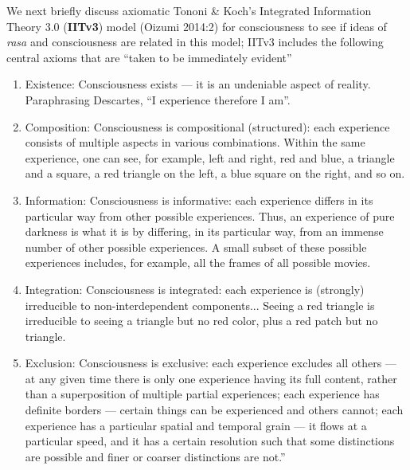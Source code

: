 We next briefly discuss axiomatic Tononi \& Koch’s Integrated Information Theory 3.0 (\textbf{IITv3}) model (Oizumi 2014:2) for consciousness to see if ideas of \textsl{rasa} and consciousness are related in this model; IITv3 includes the following central axioms that are “taken to be immediately evident”
\begin{enumerate}
\renewcommand{\labelenumi}{\theenumi:}
\item Existence: Consciousness exists --- it is an undeniable aspect of reality. Paraphrasing Descartes, “I experience therefore I am”. 
\item Composition: Consciousness is compositional (structured): each experience consists of multiple aspects in various combinations. Within the same experience, one can see, for example, left and right, red and blue, a triangle and a square, a red triangle on the left, a blue square on the right, and so on.
\item Information: Consciousness is informative: each experience differs in its particular way from other possible experiences. Thus, an experience of pure darkness is what it is by differing, in its particular way, from an immense number of other possible experiences. A small subset of these possible experiences includes, for example, all the frames of all possible movies.
\item Integration: Consciousness is integrated: each experience is (strongly) irreducible to non-interdependent components... Seeing a red triangle is irreducible to seeing a triangle but no red color, plus a red patch but no triangle.
\item Exclusion: Consciousness is exclusive: each experience excludes all others --- at any given time there is only one experience having its full content, rather than a superposition of multiple partial experiences; each experience has definite borders --- certain things can be experienced and others cannot; each experience has a particular spatial and temporal grain --- it flows at a particular speed, and it has a certain resolution such that some distinctions are possible and finer or coarser distinctions are not.”
\end{enumerate}

